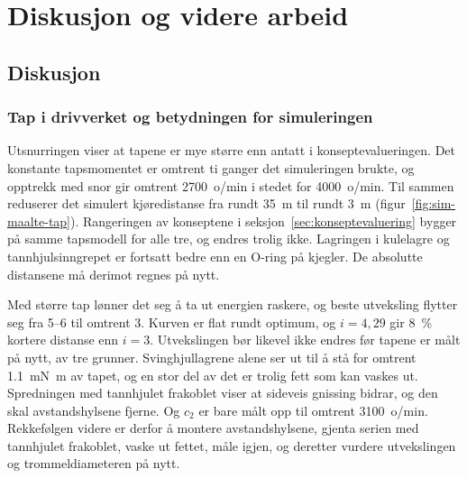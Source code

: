 \section{Diskusjon og videre arbeid}
\label{sec:diskusjon}
\subsection{Diskusjon}

\subsubsection{Tap i drivverket og betydningen for simuleringen}
Utsnurringen viser at tapene er mye større enn antatt i konseptevalueringen. Det konstante tapsmomentet er omtrent ti ganger det simuleringen brukte, og opptrekk med snor gir omtrent \SI{2700}{o/min} i stedet for \SI{4000}{o/min}. Til sammen reduserer det simulert kjøredistanse fra rundt \SI{35}{m} til rundt \SI{3}{m} (figur~\ref{fig:sim-maalte-tap}). Rangeringen av konseptene i seksjon~\ref{sec:konseptevaluering} bygger på samme tapsmodell for alle tre, og endres trolig ikke. Lagringen i kulelagre og tannhjulsinngrepet er fortsatt bedre enn en O-ring på kjegler. De absolutte distansene må derimot regnes på nytt.

Med større tap lønner det seg å ta ut energien raskere, og beste utveksling flytter seg fra 5--6 til omtrent 3. Kurven er flat rundt optimum, og $i = 4{,}29$ gir \SI{8}{\percent} kortere distanse enn $i = 3$. Utvekslingen bør likevel ikke endres før tapene er målt på nytt, av tre grunner. Svinghjullagrene alene ser ut til å stå for omtrent \SI{1,1}{mN.m} av tapet, og en stor del av det er trolig fett som kan vaskes ut. Spredningen med tannhjulet frakoblet viser at sideveis gnissing bidrar, og den skal avstandshylsene fjerne. Og $c_2$ er bare målt opp til omtrent \SI{3100}{o/min}. Rekkefølgen videre er derfor å montere avstandshylsene, gjenta serien med tannhjulet frakoblet, vaske ut fettet, måle igjen, og deretter vurdere utvekslingen og trommeldiameteren på nytt.

